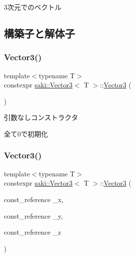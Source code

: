 3次元でのベクトル 

\subsection{構築子と解体子}
\mbox{\label{classsaki_1_1_vector3_a8617fe1a8d279c9673628728a0c5e5c6}} 
\subsubsection{\texorpdfstring{Vector3()}{Vector3()}\hspace{0.1cm}{\footnotesize\ttfamily [1/5]}}
{\footnotesize\ttfamily template$<$typename T$>$ \\
constexpr \mbox{\hyperlink{classsaki_1_1_vector3}{saki\+::\+Vector3}}$<$ T $>$\+::\mbox{\hyperlink{classsaki_1_1_vector3}{Vector3}} (\begin{DoxyParamCaption}{ }\end{DoxyParamCaption})\hspace{0.3cm}{\ttfamily [inline]}}



引数なしコンストラクタ 

全て0で初期化 \mbox{\label{classsaki_1_1_vector3_a02ad4760c906e6844a815be0dbf9aa55}} 
\subsubsection{\texorpdfstring{Vector3()}{Vector3()}\hspace{0.1cm}{\footnotesize\ttfamily [2/5]}}
{\footnotesize\ttfamily template$<$typename T$>$ \\
constexpr \mbox{\hyperlink{classsaki_1_1_vector3}{saki\+::\+Vector3}}$<$ T $>$\+::\mbox{\hyperlink{classsaki_1_1_vector3}{Vector3}} (\begin{DoxyParamCaption}\item[{const\+\_\+reference}]{\+\_\+x,  }\item[{const\+\_\+reference}]{\+\_\+y,  }\item[{const\+\_\+reference}]{\+\_\+z }\end{DoxyParamCaption})\hspace{0.3cm}{\ttfamily [inline]}}



